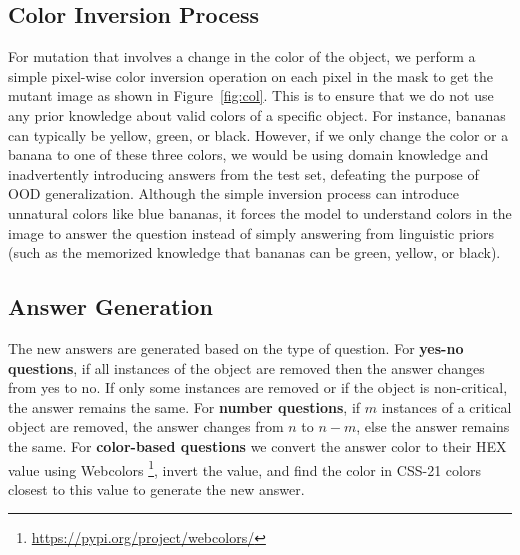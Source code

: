     
    \subsection{Color Inversion Process}
    For mutation that involves a change in the color of the object, we perform a simple pixel-wise color inversion operation on each pixel in the mask to get the mutant image as shown in Figure~\ref{fig:col}.
    This is to ensure that we do not use any prior knowledge about valid colors of a specific object.
    For instance, bananas can typically be yellow, green, or black. 
    However, if we only change the color or a banana to one of these three colors, we would be using domain knowledge and inadvertently introducing answers from the test set, defeating the purpose of OOD generalization.
    Although the simple inversion process can introduce unnatural colors like blue bananas, it forces the model to understand colors in the image to answer the question instead of simply answering from linguistic priors (such as the memorized knowledge that bananas can be green, yellow, or black).
    
    
    \subsection{Answer Generation}
    The new answers are generated based on the type of question.
    For \textbf{yes-no questions}, if all instances of the object are removed then the answer changes from yes to no. 
    If only some instances are removed or if the object is non-critical, the answer remains the same.
    For \textbf{number questions}, if $m$ instances of a critical object are removed, the answer changes from $n$ to $n-m$, else the answer remains the same.
    For \textbf{color-based questions} we convert the answer color to their HEX value using Webcolors \footnote{\url{https://pypi.org/project/webcolors/}}, invert the value, and find the color in CSS-21 colors closest to this value to generate the new answer.
       

